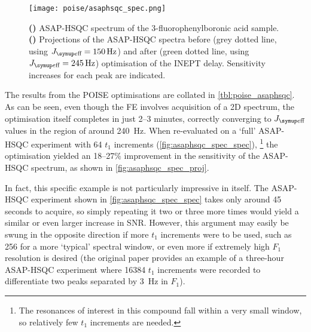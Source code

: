 \begin{figure}[htb]
    \centering
    \texttt{[image: poise/asaphsqc\_spec.png]}%
    {\label{fig:asaphsqc_spec_spec}}%
    {\label{fig:asaphsqc_spec_proj}}%
    \caption[Projections of ASAP-HSQC spectra before and after optimisation]{
        \textbf{()} ASAP-HSQC spectrum of the 3-fluorophenylboronic acid sample.
        \textbf{()} Projections of the ASAP-HSQC spectra before (grey dotted line, using $\Jeff = \qty{150}{\Hz}$) and after (green dotted line, using $\Jeff = \qty{245}{\Hz}$) optimisation of the INEPT delay.
        Sensitivity increases for each peak are indicated.
    }
    \label{fig:asaphsqc_spec}
\end{figure}

The results from the POISE optimisations are collated in \cref{tbl:poise_asaphsqc}.
As can be seen, even though the FE involves acquisition of a 2D spectrum, the optimisation itself completes in just 2--3 minutes, correctly converging to $\Jeff$ values in the region of around \qty{240}{\Hz}.
When re-evaluated on a `full' ASAP-HSQC experiment with 64 $t_1$ increments (\cref{fig:asaphsqc_spec_spec}),%
\footnote{The \carbon{} resonances of interest in this compound fall within a very small window, so relatively few $t_1$ increments are needed.}
the optimisation yielded an 18--27\% improvement in the sensitivity of the ASAP-HSQC spectrum, as shown in \cref{fig:asaphsqc_spec_proj}.

In fact, this specific example is not particularly impressive in itself.
The ASAP-HSQC experiment shown in \cref{fig:asaphsqc_spec_spec} takes only around 45 seconds to acquire, so simply repeating it two or three more times would yield a similar or even larger increase in SNR.
However, this argument may easily be swung in the opposite direction if more $t_1$ increments were to be used, such as 256 for a more `typical' \carbon{} spectral window, or even more if extremely high $F_1$ resolution is desired (the original paper\autocite{SchulzeSunninghausen2014JACS} provides an example of a three-hour ASAP-HSQC experiment where 16384 $t_1$ increments were recorded to differentiate two peaks separated by \qty{3}{\Hz} in $F_1$).
